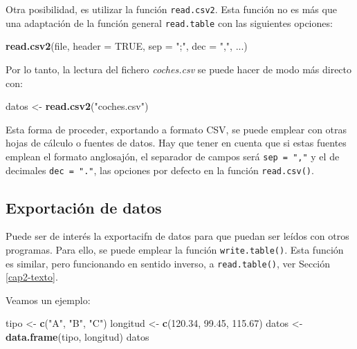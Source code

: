 \documentclass[
]{book}
\newenvironment{Shaded}{\begin{snugshade}}{\end{snugshade}}
\newcommand{\AttributeTok}[1]{\textcolor[rgb]{0.13,0.29,0.53}{#1}}
\newcommand{\ConstantTok}[1]{\textcolor[rgb]{0.56,0.35,0.01}{#1}}
\newcommand{\FloatTok}[1]{\textcolor[rgb]{0.00,0.00,0.81}{#1}}
\newcommand{\FunctionTok}[1]{\textcolor[rgb]{0.13,0.29,0.53}{\textbf{#1}}}
\newcommand{\NormalTok}[1]{#1}
\newcommand{\OtherTok}[1]{\textcolor[rgb]{0.56,0.35,0.01}{#1}}
\newcommand{\StringTok}[1]{\textcolor[rgb]{0.31,0.60,0.02}{#1}}
\begin{document}
Otra posibilidad, es utilizar la función \texttt{read.csv2}. Esta función no es más que una adaptación de la función general \texttt{read.table} con las siguientes
opciones:

\begin{Shaded}
\begin{Highlighting}[]
\FunctionTok{read.csv2}\NormalTok{(file, }\AttributeTok{header =} \ConstantTok{TRUE}\NormalTok{, }\AttributeTok{sep =} \StringTok{";"}\NormalTok{, }\AttributeTok{dec =} \StringTok{","}\NormalTok{, ...)}
\end{Highlighting}
\end{Shaded}

Por lo tanto, la lectura del fichero \emph{coches.csv} se puede hacer de modo
más directo con:

\begin{Shaded}
\begin{Highlighting}[]
\NormalTok{datos }\OtherTok{\textless{}{-}} \FunctionTok{read.csv2}\NormalTok{(}\StringTok{"coches.csv"}\NormalTok{)}
\end{Highlighting}
\end{Shaded}

Esta forma de proceder, exportando a formato CSV, se puede emplear con otras hojas de cálculo o fuentes de datos.
Hay que tener en cuenta que si estas fuentes emplean el formato anglosajón, el separador de campos será \texttt{sep\ =\ ","} y el de decimales \texttt{dec\ =\ "."}, las opciones por defecto en la función \texttt{read.csv()}.

\subsection{Exportación de datos}\label{cap2-exporta}

Puede ser de interés la exportacifn de datos para que puedan ser leídos con otros programas. Para ello, se puede emplear la función \texttt{write.table()}. Esta función es similar, pero funcionando en sentido inverso, a \texttt{read.table()}, ver Sección \ref{cap2-texto}.

Veamos un ejemplo:

\begin{Shaded}
\begin{Highlighting}[]
\NormalTok{tipo }\OtherTok{\textless{}{-}} \FunctionTok{c}\NormalTok{(}\StringTok{"A"}\NormalTok{, }\StringTok{"B"}\NormalTok{, }\StringTok{"C"}\NormalTok{)}
\NormalTok{longitud }\OtherTok{\textless{}{-}} \FunctionTok{c}\NormalTok{(}\FloatTok{120.34}\NormalTok{, }\FloatTok{99.45}\NormalTok{, }\FloatTok{115.67}\NormalTok{)}
\NormalTok{datos }\OtherTok{\textless{}{-}} \FunctionTok{data.frame}\NormalTok{(tipo, longitud)}
\NormalTok{datos}
\end{Highlighting}
\end{Shaded}
\end{document}
